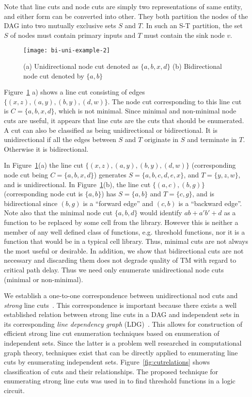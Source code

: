\documentclass[journal]{IEEEtran}
\begin{document}
Note  that  line cuts and node cuts are simply two representations of same entity, and either form can be converted into other. They both partition the nodes of the DAG into two mutually exclusive sets $S$ and $T$. In such an S-T partition, the set $S$ of nodes must contain primary inputs and  $T$ must contain the sink node $v$. 

\begin{figure}[h]
\centering
\texttt{[image: bi-uni-example-2]}
\caption {(a) Unidirectional node cut denoted as $\{a,b,x,d\}$ (b) Bidirectional node cut denoted by $\{a,b\}$ }
\label{fig:bi-uni-example}
\end{figure}

Figure~\ref{fig:bi-uni-example} a) shows a line cut consisting of edges $\{(x,z),(a,y),(b,y),(d,w)\}$. The node cut corresponding to this line cut is $C = \{a,b,x,d\}$, which is not minimal. Since minimal and non-minimal node cuts are useful, it appears that line cuts are the cuts that should be enumerated.  A cut can also be classified as being unidirectional or bidirectional. It is unidirectional if all the edges between $S$ and $T$ originate in $S$ and terminate in $T$. Otherwise it is bidirectional. 

In Figure~\ref{fig:bi-uni-example}(a) the line cut $\{(x,z),(a,y),(b,y),(d,w)\}$ (corresponding node cut being $C = \{a,b,x,d\}$) generates $S =\{a,b,c,d,e,x\}$, and $T = \{y,z,w\}$, and is unidirectional. In Figure~\ref{fig:bi-uni-example}(b), the line cut $\{(a,c),(b,g)\}$ (corresponding node cut is $\{a,b\}$) has $S = \{a,b\}$ and $T = \{c,g\}$, and is bidirectional since $(b,g)$ is a ``forward edge'' and $(c,b)$ is a ``backward edge''.  Note also that the minimal  node cut $\{a,b,d\}$ would identify $ab + a'b' + d$ as a function to be replaced by some cell from the library. However this is neither a member of any well defined class of functions, e.g. threshold functions, nor it is a function that would be in a typical cell library.  Thus, minimal cuts are not always the most useful or desirable. In addition, 
we show that bidirectional cuts are not necessary and discarding them does not degrade quality of TM with regard to critical path delay.  
Thus we need only enumerate  unidirectional node cuts (minimal or non-minimal). 

We establish a one-to-one correspondence between unidirectional nod cuts and \textit{strong} line cuts~\cite{kagaris1999maximum}. This correspondence is important because there exists a well established relation between strong line cuts in a DAG and independent sets in its corresponding \emph{line dependency graph} (LDG)~\cite{kagaris1999maximum}. This allows for construction of efficient strong line cut enumeration techniques based on enumeration of independent sets. Since the latter is a problem well researched in computational graph theory, techniques exist that can be directly applied to enumerating line cuts by enumerating independent sets. Figure~\ref{fig:cutrelations} shows classification of cuts and their relationships.
The proposed technique for enumerating strong line cuts was used in \cite{Niranjan2010} to find threshold functions in a logic circuit.
\end{document}
